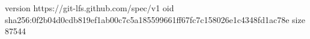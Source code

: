 version https://git-lfs.github.com/spec/v1
oid sha256:0f2b04d0cdb819ef1ab00c7c5a185599661ff67fc7c158026e1c4348fd1ac78e
size 87544
